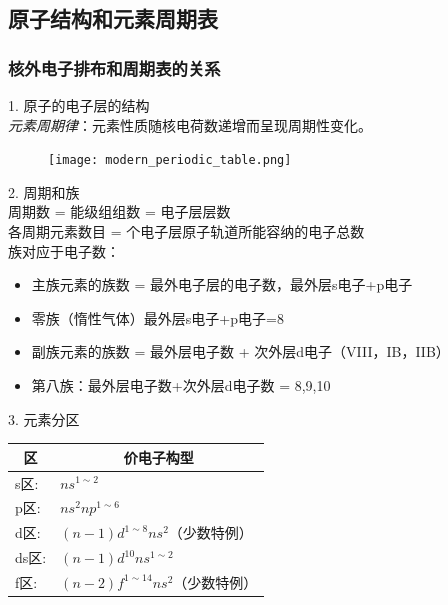 \documentclass[utf8,a4paper,12pt]{ctexart}
\begin{document}
\subsection{原子结构和元素周期表}
\subsubsection{核外电子排布和周期表的关系}
1. 原子的电子层的结构\\
\emph{元素周期律}：元素性质随核电荷数递增而呈现周期性变化。\\
\begin{figure}[H]
\centering
\texttt{[image: modern\_periodic\_table.png]}

\end{figure}
2. 周期和族\\
周期数 = 能级组组数 = 电子层层数\\
各周期元素数目 = 个电子层原子轨道所能容纳的电子总数\\
族对应于电子数：
\begin{itemize}
\item 主族元素的族数 = 最外电子层的电子数，最外层s电子+p电子
\item 零族（惰性气体）最外层s电子+p电子=8
\item 副族元素的族数 = 最外层电子数 + 次外层d电子（VIII，IB，IIB）
\item 第八族：最外层电子数+次外层d电子数 = 8,9,10
\end{itemize}
3. 元素分区
\begin{table}[H]
\centering
\begin{tabular}{ll}
\toprule
\multicolumn{1}{c}{区} & \multicolumn{1}{c}{价电子构型}\\
\hline
s区: & $ns^{1\sim2}$\\
p区: & $ns^2np^{1\sim6}$\\
d区: & $(n-1)d^{1\sim8}ns^2$（少数特例）\\
ds区: & $(n-1)d^{10}ns^{1\sim2}$\\
f区: & $(n-2)f^{1\sim14}ns^2$（少数特例）\\
\bottomrule
\end{tabular}
\end{table}
\end{document}
